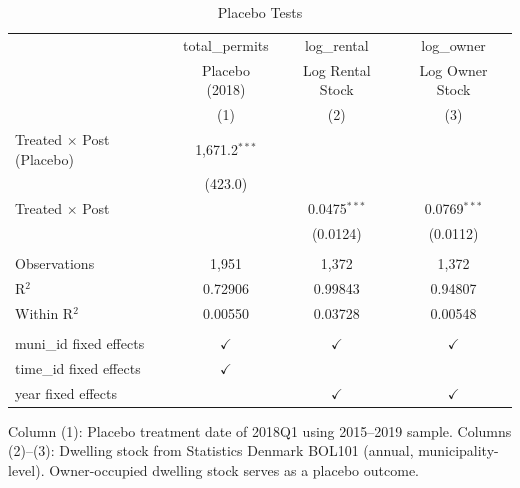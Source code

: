 
\begin{table}[htbp]
   \caption{\label{tab:placebo} Placebo Tests}
   \bigskip
   \centering
   \begin{tabular}{lccc}
      \toprule
                                       & total\_permits  & log\_rental      & log\_owner\\   
                                       & Placebo (2018)  & Log Rental Stock & Log Owner Stock \\   
                                       & (1)             & (2)              & (3)\\  
      \midrule 
      Treated $\times$ Post (Placebo)  & 1,671.2$^{***}$ &                  &   \\   
                                       & (423.0)         &                  &   \\   
      Treated $\times$ Post            &                 & 0.0475$^{***}$   & 0.0769$^{***}$\\   
                                       &                 & (0.0124)         & (0.0112)\\   
       \\
      Observations                     & 1,951           & 1,372            & 1,372\\  
      R$^2$                            & 0.72906         & 0.99843          & 0.94807\\  
      Within R$^2$                     & 0.00550         & 0.03728          & 0.00548\\  
       \\
      muni\_id fixed effects           & $\checkmark$    & $\checkmark$     & $\checkmark$\\   
      time\_id fixed effects           & $\checkmark$    &                  & \\  
      year fixed effects               &                 & $\checkmark$     & $\checkmark$\\   
      \bottomrule
   \end{tabular}
   
   \par \raggedright 
   Column (1): Placebo treatment date of 2018Q1 using 2015--2019 sample. Columns (2)--(3): Dwelling stock from Statistics Denmark BOL101 (annual, municipality-level). Owner-occupied dwelling stock serves as a placebo outcome.
\end{table}


